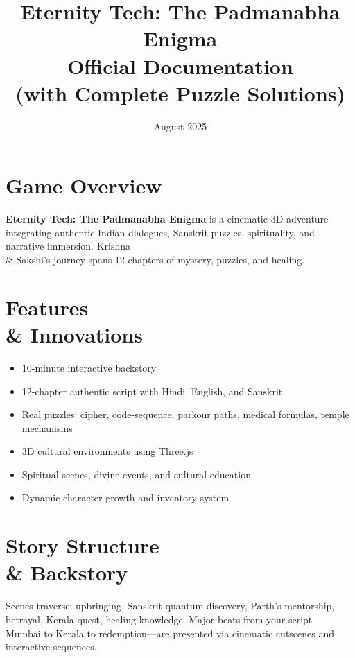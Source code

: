 \documentclass[12pt]{article}
\title{Eternity Tech: The Padmanabha Enigma \\ Official Documentation \\ (with Complete Puzzle Solutions)}
\author{}
\date{August 2025}
\begin{document}
\maketitle

\tableofcontents

\section{Game Overview}
\textbf{Eternity Tech: The Padmanabha Enigma} is a cinematic 3D adventure integrating authentic Indian dialogues, Sanskrit puzzles, spirituality, and narrative immersion. Krishna \\& Sakshi's journey spans 12 chapters of mystery, puzzles, and healing.

\section{Features \\& Innovations}
\begin{itemize}[leftmargin=1.5em]
  \item 10-minute interactive backstory \newline
  \item 12-chapter authentic script with Hindi, English, and Sanskrit \newline
  \item Real puzzles: cipher, code-sequence, parkour paths, medical formulas, temple mechanisms \newline
  \item 3D cultural environments using Three.js \newline
  \item Spiritual scenes, divine events, and cultural education \newline
  \item Dynamic character growth and inventory system \newline
\end{itemize}

\section{Story Structure \\& Backstory}
Scenes traverse: upbringing, Sanskrit-quantum discovery, Parth's mentorship, betrayal, Kerala quest, healing knowledge. Major beats from your script—Mumbai to Kerala to redemption—are presented via cinematic cutscenes and interactive sequences.
\end{document}
